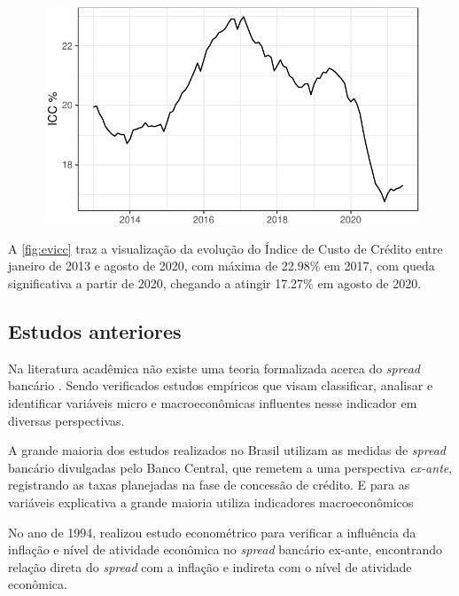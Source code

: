 \documentclass[12pt,openright,oneside,a4paper,chapter=TITLE,section=TITLE,subsection=TITLE,english,french,spanish,portugues,sumario=tradicional]{abntex2}
\begin{document}
\begin{figure}

\begin{center}\includegraphics{12-exportedfigures/ICC-1} \end{center}
\label{fig:evicc}
\end{figure}

A \autoref{fig:evicc} traz a visualização da evolução do Índice de Custo de
Crédito entre janeiro de 2013 e agosto de 2020, com máxima de 22.98\% em
2017, com queda significativa a partir de 2020, chegando a atingir 17.27\%
em agosto de 2020.

\subsection{Estudos anteriores}

Na literatura acadêmica não existe uma teoria formalizada acerca do \emph{spread}
bancário \cite{timotio:2018}. Sendo verificados estudos empíricos que visam
classificar, analisar e identificar variáveis micro e macroeconômicas
influentes nesse indicador em diversas perspectivas.

A grande maioria dos estudos realizados no Brasil utilizam as medidas de
\emph{spread} bancário divulgadas pelo Banco Central, que remetem a uma perspectiva
\emph{ex-ante}, registrando as taxas planejadas na fase de concessão de crédito. E
para as variáveis explicativa a grande maioria utiliza indicadores
macroeconômicos \cite{dantas:2012}

No ano de 1994, \textcite{aronovich:1994} realizou estudo econométrico para
verificar a influência da inflação e nível de atividade econômica no \emph{spread}
bancário ex-ante, encontrando relação direta do \emph{spread} com a inflação e
indireta com o nível de atividade econômica.
\end{document}

